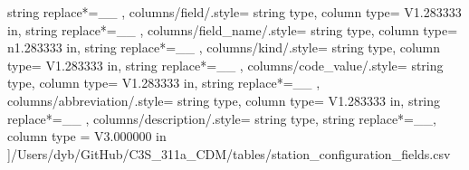 \begin{landscape}
{            string replace*={_}{\_}
        },
    columns/field/.style={
            string type, 
            column type= V{1.283333 in}, 
            string replace*={_}{\_}
        },
    columns/field_name/.style={
            string type, 
            column type= n{1.283333 in}, 
            string replace*={_}{\_}
        },
    columns/kind/.style={
            string type, 
            column type= V{1.283333 in}, 
            string replace*={_}{\_}
        },
    columns/code_value/.style={
            string type, 
            column type= V{1.283333 in}, 
            string replace*={_}{\_}
        },
    columns/abbreviation/.style={
            string type, 
            column type= V{1.283333 in}, 
            string replace*={_}{\_}
        },
    columns/description/.style={
            string type, 
            string replace*={_}{\_},
            column type = V{3.000000 in}
        }
    ]{/Users/dyb/GitHub/C3S_311a_CDM/tables/station_configuration_fields.csv}
\end{landscape}
